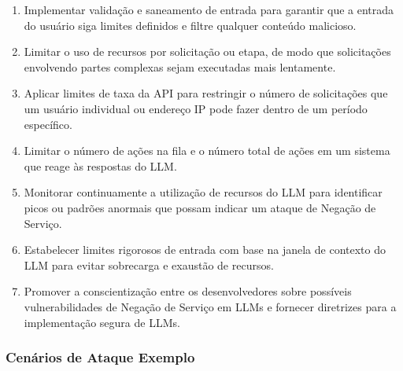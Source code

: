 \documentclass[
]{article}
\providecommand{\tightlist}{%
  \setlength{\itemsep}{0pt}\setlength{\parskip}{0pt}}
\begin{document}
\begin{enumerate}
\def\labelenumi{\arabic{enumi}.}
\tightlist
\item
  Implementar validação e saneamento de entrada para garantir que a
  entrada do usuário siga limites definidos e filtre qualquer conteúdo
  malicioso.
\item
  Limitar o uso de recursos por solicitação ou etapa, de modo que
  solicitações envolvendo partes complexas sejam executadas mais
  lentamente.
\item
  Aplicar limites de taxa da API para restringir o número de
  solicitações que um usuário individual ou endereço IP pode fazer
  dentro de um período específico.
\item
  Limitar o número de ações na fila e o número total de ações em um
  sistema que reage às respostas do LLM.
\item
  Monitorar continuamente a utilização de recursos do LLM para
  identificar picos ou padrões anormais que possam indicar um ataque de
  Negação de Serviço.
\item
  Estabelecer limites rigorosos de entrada com base na janela de
  contexto do LLM para evitar sobrecarga e exaustão de recursos.
\item
  Promover a conscientização entre os desenvolvedores sobre possíveis
  vulnerabilidades de Negação de Serviço em LLMs e fornecer diretrizes
  para a implementação segura de LLMs.
\end{enumerate}

\subsubsection{Cenários de Ataque
Exemplo}\label{cenuxe1rios-de-ataque-exemplo}
\end{document}
